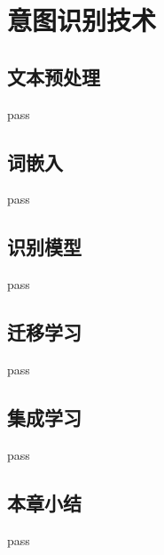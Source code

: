 \chapter{意图识别技术}
\label{cha:tech}

\section{文本预处理}

pass

\section{词嵌入}

pass

\section{识别模型}

pass

\section{迁移学习}

pass

\section{集成学习}

pass

\section{本章小结}

pass
